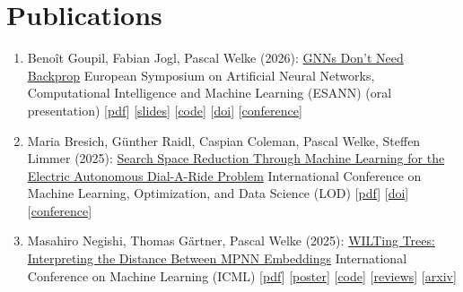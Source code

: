 \documentclass{scrartcl}
\begin{document}
\section{Publications}
\begin{enumerate}
\conti
\item
\label{goupil2026nobackprop}
Benoît Goupil, Fabian Jogl, Pascal Welke (2026):\newline
\href{https://dx.doi.org/10.14428/esann/2026.ES2026-340}{GNNs Don’t Need Backprop}\newline
European Symposium on Artificial Neural Networks, Computational Intelligence and Machine Learning (ESANN)\newline
(oral presentation)\newline
{\footnotesize
[\href{https://pwelke.de/publications/goupil2026gnnsdontneedbackprop.pdf}{pdf}]
[\href{https://pwelke.de/publications/goupil2026gnnsdontneedbackprop-presentation-welke.pdf}{slides}]
[\href{https://github.com/Benoit-Goupil/NoBackProp}{code}]
[\href{https://dx.doi.org/10.14428/esann/2026.ES2026-340}{doi}]
[\href{https://iclr.cc/2026}{conference}]
}
\item
\label{bresich2025}
Maria Bresich, Günther Raidl, Caspian Coleman, Pascal Welke, Steffen Limmer (2025):\newline
\href{https://dx.doi.org/10.1007/978-3-032-21480-5_13}{Search Space Reduction Through Machine Learning for the Electric Autonomous Dial-A-Ride Problem}\newline
International Conference on Machine Learning, Optimization, and Data Science (LOD)\newline
{\footnotesize
[\href{https://pwelke.de/publications/bresich2025eadarp.pdf}{pdf}]
[\href{https://dx.doi.org/10.1007/978-3-032-21480-5_13}{doi}]
[\href{https://lod2025.icas.events/}{conference}]
}
\item
\label{negishi2025wiltingtrees}
Masahiro Negishi, Thomas Gärtner, Pascal Welke (2025):\newline
\href{https://proceedings.mlr.press/v267/negishi25a.html}{WILTing Trees: Interpreting the Distance Between MPNN Embeddings}\newline
International Conference on Machine Learning (ICML)\newline
{\footnotesize
[\href{https://pwelke.de/publications/negishi2025icml.pdf}{pdf}]
[\href{https://pwelke.de/publications/negishi2025icmlposter.pdf}{poster}]
[\href{https://github.com/masahiro-negishi/wilt}{code}]
[\href{https://openreview.net/forum?id=lflqQWP1jy}{reviews}]
[\href{https://arxiv.org/abs/2505.24642}{arxiv}]
}
\end{enumerate}
\end{document}
